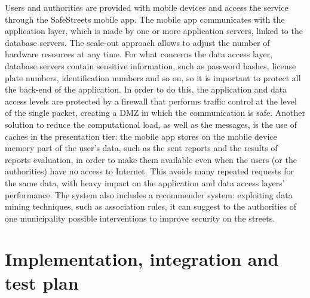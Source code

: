 \documentclass[12pt,a4paper]{report}
\begin{document}
	Users and authorities are provided with mobile devices and access the service through
	the SafeStreets mobile app. The mobile app communicates with the application layer, which
	is made by one or more application servers, linked to the database servers. The scale-out approach allows to adjust the number of hardware resources at any time. For what concerns the data access layer, database servers contain sensitive information, such as password hashes, license plate numbers, identification numbers and so on, so it is important to protect all the back-end of the application. In order to do this, the application and data access levels are protected by a firewall that performs traffic control at the level of the single packet, creating a DMZ in which the communication is safe. Another solution to reduce the computational load, as well as the messages, is the use of caches in the presentation tier: the mobile app stores on the mobile device memory part of the user's data, such as the sent reports and the results of reports evaluation, in order to make them available even when the users (or the authorities) have no access to Internet. This avoids many repeated requests for the same data, with heavy impact on the application and data access layers' performance.
The system also includes a recommender system: exploiting data mining techniques, such as association rules, it can suggest to the authorities of one municipality possible interventions to improve security on the streets.

		
	\chapter{Implementation, integration and test plan}
\end{document}
